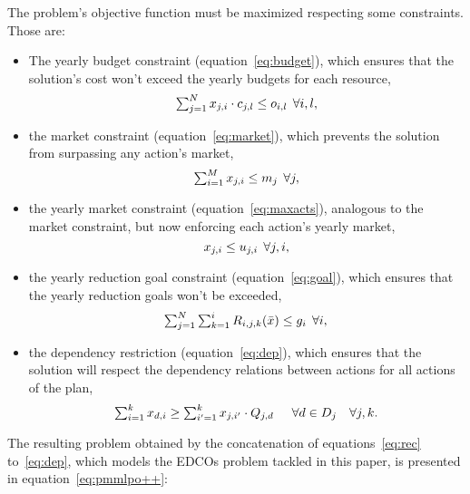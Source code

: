 The problem's objective function must be maximized respecting some constraints. Those are:

\begin{itemize}
  \item The yearly budget constraint (equation~\ref{eq:budget}), which ensures that the solution's cost won't exceed the yearly budgets for each resource, 
    \begin{equation}
        \mymathstyle
	\sum_{j=1}^{N} x_{j, i} \cdot c_{j,l} \le o_{i,l} \, \; \forall i, l,
	    \label{eq:budget}
    \end{equation}
  \item the market constraint (equation~\ref{eq:market}), which prevents the solution from surpassing any action's market,
    \begin{equation}
        \mymathstyle
	\sum_{i=1}^{M} x_{j, i} \le m_j \, \; \forall j,
	    \label{eq:market}
    \end{equation} 
  \item the yearly market constraint (equation~\ref{eq:maxacts}), analogous to the market constraint, but now enforcing each action's yearly market,
    \begin{equation}
        \mymathstyle
	x_{j, i} \le u_{j, i} \, \; \forall j, i,
	    \label{eq:maxacts}
    \end{equation} 
  \item  the yearly reduction goal constraint (equation~\ref{eq:goal}), which ensures that the yearly reduction goals won't be exceeded,
    \begin{equation}
        \mymathstyle
	\label{eq:goal}
	\sum_{j=1}^{N} \sum_{k=1}^{i}R_{i,j,k}(\bar{x}) \leq g_i \, \; \forall i, \\
    \end{equation} 
  \item the dependency restriction (equation~\ref{eq:dep}), which ensures that the solution will respect the dependency relations between actions for all actions of the plan,
    \begin{equation}
        \mymathstyle
	\label{eq:dep}
	\sum_{i=1}^{k} x_{d, i} \ge \sum_{i'=1}^{k} x_{j, i'} \cdot Q_{j, d} \, \; \quad \forall d \in D_j \quad \forall j,k.
    \end{equation}
\end{itemize}

The resulting problem obtained by the concatenation of equations~\ref{eq:rec} to~\ref{eq:dep}, which models the EDCOs problem tackled in this paper, is presented in equation~\ref{eq:pmmlpo++}:

